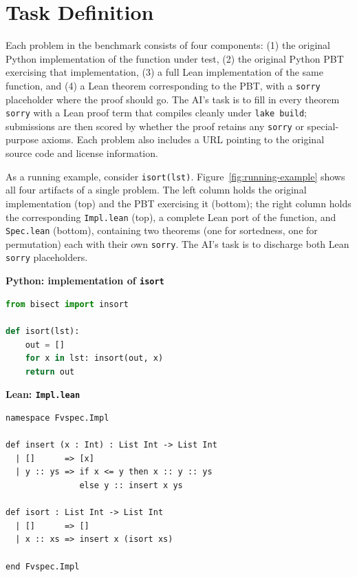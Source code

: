 \section{Task Definition}

Each problem in the \FVSpec benchmark consists of four components: (1) the original Python implementation of the function under test, (2) the original Python PBT exercising that implementation, (3) a full Lean implementation of the same function, and (4) a Lean theorem corresponding to the PBT, with a \texttt{sorry} placeholder where the proof should go. The AI's task is to fill in every theorem \texttt{sorry} with a Lean proof term that compiles cleanly under \texttt{lake build}; submissions are then scored by whether the proof retains any \texttt{sorry} or special-purpose axioms. Each problem also includes a URL pointing to the original source code and license information.

As a running example, consider \texttt{isort(lst)}. Figure~\ref{fig:running-example}
shows all four artifacts of a single \FVSpec problem. The left column holds
the original implementation (top) and the PBT exercising it
(bottom); the right column holds the corresponding \texttt{Impl.lean}
(top), a complete Lean port of the function, and \texttt{Spec.lean}
(bottom), containing two theorems (one for sortedness, one for permutation)
each with their own \texttt{sorry}. The AI's task is to discharge both
Lean \texttt{sorry} placeholders.

\begin{lrbox}{\fvspecPyImplBox}%
\begin{minipage}{0.36\linewidth}
{\small\sffamily\textbf{Python: implementation of \texttt{isort}}}\par\smallskip
\begin{lstlisting}[style=code, language=Python, basicstyle=\ttfamily\scriptsize]
from bisect import insort

def isort(lst):
    out = []
    for x in lst: insort(out, x)
    return out
\end{lstlisting}
\end{minipage}%
\end{lrbox}%

\begin{lrbox}{\fvspecImplBox}%
\begin{minipage}{0.46\linewidth}
{\small\sffamily\textbf{Lean: \texttt{Impl.lean}}}\par\smallskip
\begin{lstlisting}[style=code, language=Lean, basicstyle=\ttfamily\scriptsize]
namespace Fvspec.Impl

def insert (x : Int) : List Int -> List Int
  | []      => [x]
  | y :: ys => if x <= y then x :: y :: ys
               else y :: insert x ys

def isort : List Int -> List Int
  | []      => []
  | x :: xs => insert x (isort xs)

end Fvspec.Impl
\end{lstlisting}
\end{minipage}%
\end{lrbox}%

